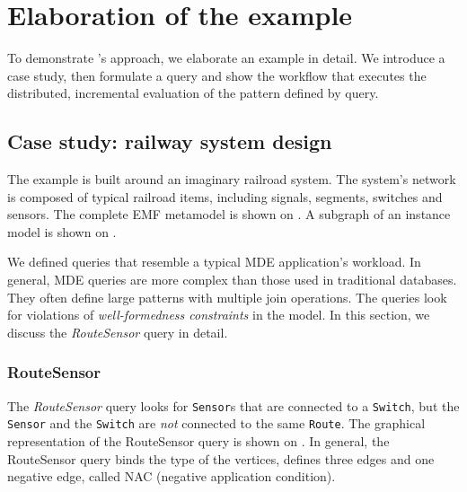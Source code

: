 \section{Elaboration of the example}
\label{sec:elaboration}

To demonstrate \iqd{}'s approach, we elaborate an example in detail. We introduce a case study, then formulate a query and show the workflow that executes the distributed, incremental evaluation of the pattern defined by query.

\subsection{Case study: railway system design}
\label{subsec:casestudy}


The example is built around an imaginary railroad system. The system's network is composed of typical railroad items, including signals, segments, switches and sensors. The complete EMF metamodel is shown on . A subgraph of an instance model is shown on .


We defined queries that resemble a typical MDE application's workload. In general, MDE queries are more complex than those used in traditional databases. They often define large patterns with multiple join operations. The queries look for violations of \emph{well-formedness constraints} in the model. In this section, we discuss the \textit{RouteSensor} query in detail.

\subsubsection{RouteSensor}


The \textit{RouteSensor} query looks for \texttt{Sensor}s that are connected to a \texttt{Switch}, but the \texttt{Sensor} and the \texttt{Switch} are \emph{not} connected to the same \texttt{Route}. The graphical representation of the RouteSensor query is shown on . In general, the RouteSensor query binds the type of the vertices, defines three edges and one negative edge, called NAC (negative application condition). 

